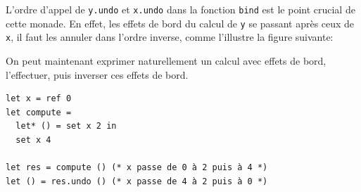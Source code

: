 \documentclass[final]{jflart}
\begin{document}
L'ordre d'appel de \texttt{y.undo} et \texttt{x.undo} dans la fonction
\texttt{bind} est le point crucial de cette monade. En effet, les effets de bord du calcul de \texttt{y} se passant après ceux de \texttt{x}, il faut les annuler dans l'ordre inverse, comme l'illustre la figure suivante:

\begin{center}
\end{center}

On peut maintenant exprimer naturellement un calcul avec effets de bord, l'effectuer, puis inverser ces effets de bord.

\begin{verbatim}
let x = ref 0
let compute =
  let* () = set x 2 in
  set x 4

let res = compute () (* x passe de 0 à 2 puis à 4 *)
let () = res.undo () (* x passe de 4 à 2 puis à 0 *)
\end{verbatim}


\end{document}
